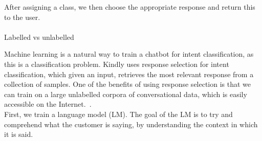 \documentclass{report}
\begin{document}
After assigning a class, we then choose the appropriate response and return this to the user. \\\\ 

Labelled vs unlabelled

Machine learning is a natural way to train a chatbot for intent classification, as this is a classification problem.
Kindly uses response selection for intent classification, which given an input, retrieves the most relevant response from a collection of samples. One of the benefits of using response selection is that we can train on a large unlabelled corpora of conversational data, which is easily accessible on the Internet.~\cite{Henderson-Task-Oriented}.\\
First, we train a language model (LM). The goal of the LM is to try and comprehend what the customer is saying, by understanding the context in which it is said.
\end{document}
